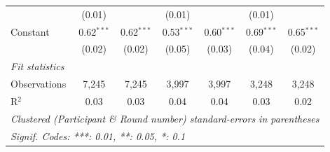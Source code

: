 \begin{tabular}{lcccccc}
                                  & (0.01)        &               & (0.01)       &              & (0.01)       &   \\   
   Constant                       & 0.62$^{***}$  & 0.62$^{***}$  & 0.53$^{***}$ & 0.60$^{***}$ & 0.69$^{***}$ & 0.65$^{***}$\\   
                                  & (0.02)        & (0.02)        & (0.05)       & (0.03)       & (0.04)       & (0.02)\\   
   \midrule
   \emph{Fit statistics}\\
   Observations                   & 7,245         & 7,245         & 3,997        & 3,997        & 3,248        & 3,248\\  
   R$^2$                          & 0.03          & 0.03          & 0.04         & 0.04         & 0.03         & 0.02\\  
   \midrule \midrule
   \multicolumn{7}{l}{\emph{Clustered (Participant \& Round number) standard-errors in parentheses}}\\
   \multicolumn{7}{l}{\emph{Signif. Codes: ***: 0.01, **: 0.05, *: 0.1}}\\
\end{tabular}
\par\endgroup
